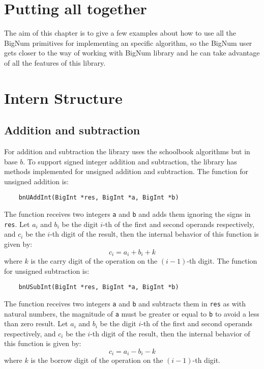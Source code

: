 \documentclass{book}
\begin{document}
\chapter{Putting all together}

The aim of this chapter is to give a few examples about how to use all the BigNum primitives for implementing an specific algorithm, so the BigNum user gets closer to the way of working with BigNum library and he can take advantage of all the features of this library.  



\chapter{Intern Structure}

\section{Addition and subtraction}
\label{sect:add}
For addition and subtraction the library uses the schoolbook algorithms but in base $b$. To support signed integer addition and subtraction, the library has methods implemented for unsigned addition and subtraction. The function for unsigned addition is:
    \begin{verbatim}
    bnUAddInt(BigInt *res, BigInt *a, BigInt *b)
    \end{verbatim}
The function receives two integers \verb+a+ and \verb+b+ and adds them ignoring the signs in \verb+res+. Let $a_i$ and $b_i$ be the digit $i$-th of the first and second operands respectively, and $c_i$ be the $i$-th digit of the result, then the internal behavior of this function is given by:
\[c_i = a_i + b_i + k \]
where $k$ is the carry digit of the operation on the $(i-1)$-th digit. The function for unsigned subtraction is:
    \begin{verbatim}
    bnUSubInt(BigInt *res, BigInt *a, BigInt *b)
    \end{verbatim}
The function receives two integers \verb+a+ and \verb+b+ and subtracts them in \verb+res+ as with natural numbers, the magnitude of \verb+a+ must be greater or equal to \verb+b+ to avoid a less than zero result. Let $a_i$ and $b_i$ be the digit $i$-th of the first and second operands respectively, and $c_i$ be the $i$-th digit of the result, then the internal behavior of this function is given by:
\[c_i = a_i - b_i - k \]
where $k$ is the borrow digit of the operation on the $(i-1)$-th digit. \\
\end{document}
